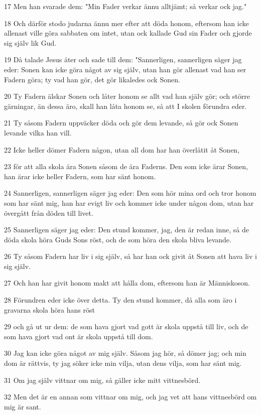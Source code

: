 \par 17 Men han svarade dem: "Min Fader verkar ännu alltjämt; så verkar ock jag."
\par 18 Och därför stodo judarna ännu mer efter att döda honom, eftersom han icke allenast ville göra sabbaten om intet, utan ock kallade Gud sin Fader och gjorde sig själv lik Gud.
\par 19 Då talade Jesus åter och sade till dem: "Sannerligen, sannerligen säger jag eder: Sonen kan icke göra något av sig själv, utan han gör allenast vad han ser Fadern göra; ty vad han gör, det gör likaledes ock Sonen.
\par 20 Ty Fadern älskar Sonen och låter honom se allt vad han själv gör; och större gärningar, än dessa äro, skall han låta honom se, så att I skolen förundra eder.
\par 21 Ty såsom Fadern uppväcker döda och gör dem levande, så gör ock Sonen levande vilka han vill.
\par 22 Icke heller dömer Fadern någon, utan all dom har han överlåtit åt Sonen,
\par 23 för att alla skola ära Sonen såsom de ära Faderns. Den som icke ärar Sonen, han ärar icke heller Fadern, som har sänt honom.
\par 24 Sannerligen, sannerligen säger jag eder: Den som hör mina ord och tror honom som har sänt mig, han har evigt liv och kommer icke under någon dom, utan har övergått från döden till livet.
\par 25 Sannerligen säger jag eder: Den stund kommer, jag, den är redan inne, så de döda skola höra Guds Sons röst, och de som höra den skola bliva levande.
\par 26 Ty såsom Fadern har liv i sig själv, så har han ock givit åt Sonen att hava liv i sig själv.
\par 27 Och han har givit honom makt att hålla dom, eftersom han är Människoson.
\par 28 Förundren eder icke över detta. Ty den stund kommer, då alla som äro i gravarna skola höra hans röst
\par 29 och gå ut ur dem: de som hava gjort vad gott är skola uppstå till liv, och de som hava gjort vad ont är skola uppstå till dom.
\par 30 Jag kan icke göra något av mig själv. Såsom jag hör, så dömer jag; och min dom är rättvis, ty jag söker icke min vilja, utan dens vilja, som har sänt mig.
\par 31 Om jag själv vittnar om mig, så gäller icke mitt vittnesbörd.
\par 32 Men det är en annan som vittnar om mig, och jag vet att hans vittnesbörd om mig är sant.

